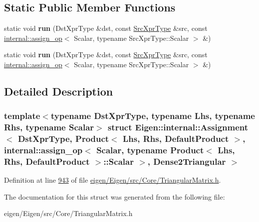 \subsection*{Static Public Member Functions}
\begin{DoxyCompactItemize}
\item 
\mbox{\label{struct_eigen_1_1internal_1_1_assignment_3_01_dst_xpr_type_00_01_product_3_01_lhs_00_01_rhs_00_0193a1d113168a246bb6cb34430a4d0595_a5a4f87a4c03524b1caca94cde6e215ae}} 
static void {\bfseries run} (Dst\+Xpr\+Type \&dst, const \hyperlink{group___core___module_class_eigen_1_1_product}{Src\+Xpr\+Type} \&src, const \hyperlink{struct_eigen_1_1internal_1_1assign__op}{internal\+::assign\+\_\+op}$<$ Scalar, typename Src\+Xpr\+Type\+::\+Scalar $>$ \&)
\item 
\mbox{\label{struct_eigen_1_1internal_1_1_assignment_3_01_dst_xpr_type_00_01_product_3_01_lhs_00_01_rhs_00_0193a1d113168a246bb6cb34430a4d0595_a5a4f87a4c03524b1caca94cde6e215ae}} 
static void {\bfseries run} (Dst\+Xpr\+Type \&dst, const \hyperlink{group___core___module_class_eigen_1_1_product}{Src\+Xpr\+Type} \&src, const \hyperlink{struct_eigen_1_1internal_1_1assign__op}{internal\+::assign\+\_\+op}$<$ Scalar, typename Src\+Xpr\+Type\+::\+Scalar $>$ \&)
\end{DoxyCompactItemize}


\subsection{Detailed Description}
\subsubsection*{template$<$typename Dst\+Xpr\+Type, typename Lhs, typename Rhs, typename Scalar$>$\newline
struct Eigen\+::internal\+::\+Assignment$<$ Dst\+Xpr\+Type, Product$<$ Lhs, Rhs, Default\+Product $>$, internal\+::assign\+\_\+op$<$ Scalar, typename Product$<$ Lhs, Rhs, Default\+Product $>$\+::\+Scalar $>$, Dense2\+Triangular $>$}



Definition at line \hyperlink{eigen_2_eigen_2src_2_core_2_triangular_matrix_8h_source_l00943}{943} of file \hyperlink{eigen_2_eigen_2src_2_core_2_triangular_matrix_8h_source}{eigen/\+Eigen/src/\+Core/\+Triangular\+Matrix.\+h}.



The documentation for this struct was generated from the following file\+:\begin{DoxyCompactItemize}
\item 
eigen/\+Eigen/src/\+Core/\+Triangular\+Matrix.\+h\end{DoxyCompactItemize}
